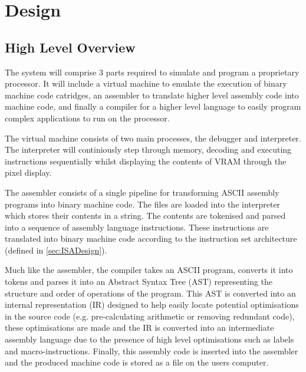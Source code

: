 \section{Design}

\subsection{High Level Overview}

The system will comprise 3 parts required to simulate and program a proprietary processor. It will include a virtual machine to emulate the execution of binary machine code catridges, an assembler to translate higher level assembly code into machine code, and finally a compiler for a higher level language to easily program complex applications to run on the processor.

The virtual machine consists of two main processes, the debugger and interpreter. The interpreter will continiously step through memory, decoding and executing instructions sequentially whilst displaying the contents of VRAM through the pixel display.


\bigskip

The assembler consists of a single pipeline for transforming ASCII assembly programs into binary machine code. The files are loaded into the interpreter which stores their contents in a string. The contents are tokenised and parsed into a sequence of assembly language instructions. These instructions are translated into binary machine code according to the instruction set architecture (defined in \ref{sec:ISADesign}).

\bigskip


\bigskip

Much like the assembler, the compiler takes an ASCII program, converts it into tokens and parses it into an Abstract Syntax Tree (AST) representing the structure and order of operations of the program. This AST is converted into an internal representation (IR) designed to help easily locate potential optimisations in the source code (e.g. pre-calculating arithmetic or removing redundant code), these optimisations are made and the IR is converted into an intermediate assembly language due to the presence of high level optimisations such as labels and macro-instructions. Finally, this assembly code is inserted into the assembler and the produced machine code is stored as a file on the users computer. 

